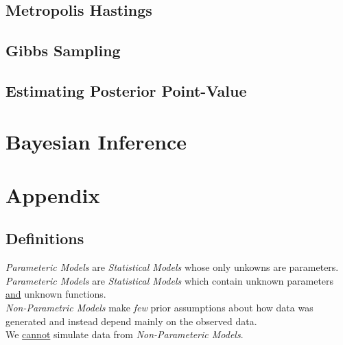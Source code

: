 \documentclass[11pt,a4paper]{article}
\begin{document}

\subsection{Metropolis Hastings}

\subsection{Gibbs Sampling}

\subsection{Estimating Posterior Point-Value}


\section{Bayesian Inference}


\newpage\setcounter{section}{-1}
\section{Appendix}

\subsection{Definitions}

\textit{Parameteric Models} are \textit{Statistical Models} whose only unkowns are parameters.\\

\textit{Parameteric Models} are \textit{Statistical Models} which contain unknown parameters \underline{and} unknown functions.\\

\textit{Non-Parametric Models} make \textit{few} prior assumptions about how data was generated and instead depend mainly on the observed data.\\
We \underline{cannot} simulate data from \textit{Non-Parameteric Models}.\\
\end{document}
